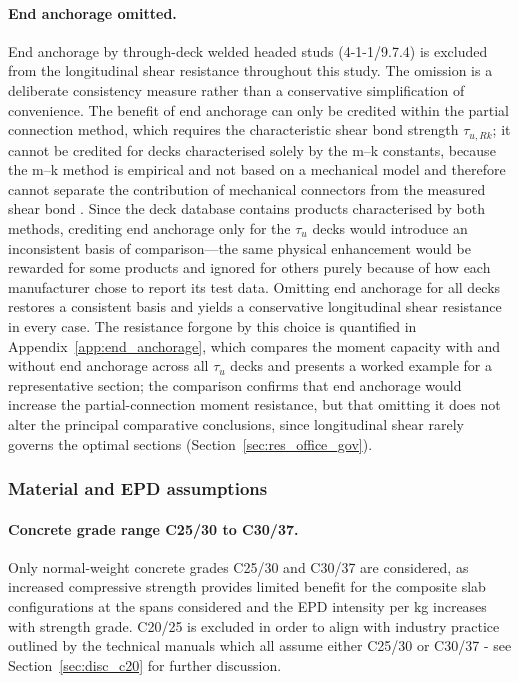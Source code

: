 \paragraph{End anchorage omitted.}
End anchorage by through-deck welded headed studs (4-1-1/9.7.4) is excluded from the longitudinal shear resistance throughout this study. The omission is a deliberate consistency measure rather than a conservative simplification of convenience. The benefit of end anchorage can only be credited within the partial connection method, which requires the characteristic shear bond strength $\tau_{u,Rk}$; it cannot be credited for decks characterised solely by the m--k constants, because the m--k method is empirical and not based on a mechanical model and therefore cannot separate the contribution of mechanical connectors from the measured shear bond \citep{RefWorks:bode1993modern}. Since the deck database contains products characterised by both methods, crediting end anchorage only for the $\tau_u$ decks would introduce an inconsistent basis of comparison---the same physical enhancement would be rewarded for some products and ignored for others purely because of how each manufacturer chose to report its test data. Omitting end anchorage for all decks restores a consistent basis and yields a conservative longitudinal shear resistance in every case. The resistance forgone by this choice is quantified in Appendix~\ref{app:end_anchorage}, which compares the moment capacity with and without end anchorage across all $\tau_u$ decks and presents a worked example for a representative section; the comparison confirms that end anchorage would increase the partial-connection moment resistance, but that omitting it does not alter the principal comparative conclusions, since longitudinal shear rarely governs the optimal sections (Section~\ref{sec:res_office_gov}).

\subsubsection*{Material and EPD assumptions}

\paragraph{Concrete grade range C25/30 to C30/37.}
Only normal-weight concrete grades C25/30 and C30/37 are considered, as increased compressive strength provides limited benefit for the composite slab configurations at the spans considered and the EPD intensity per kg increases with strength grade. C20/25 is excluded in order to align with industry practice outlined by the technical manuals which all assume either C25/30 or C30/37 - see Section~\ref{sec:disc_c20} for further discussion.

